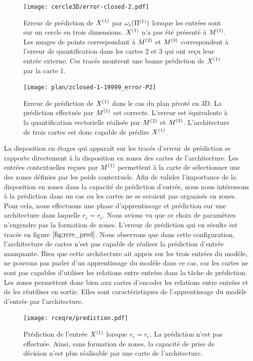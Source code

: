 \documentclass[../main]{subfiles}
\begin{document}
\begin{figure}
	\texttt{[image: cercle3D/error-closed-2.pdf]}
	\caption{Erreur de prédiction de $X^{({1})}$ par $\omega_e(\Pi^{({1})})$ lorsque les entrées sont sur un cercle en trois dimensions. $X^{({1})}$ n'a pas été présenté à $M^{({1})}$.
	 Les nuages de points correspondant à $M^{({2})}$ et $M^{({3})}$ correspondent à l'erreur de quantification dans les cartes 2 et 3 qui ont reçu leur entrée externe. Ces tracés montrent une bonne prédiction de $X^{({1})}$ par la carte 1. \label{fig:pred_cercle}}
\end{figure}

\begin{figure}
	\texttt{[image: plan/zclosed-1-19999\_error-P2]}	
	\caption{Erreur de prédiction de $X^{({1})}$ dans le cas du plan pivoté en 3D. La prédiction effectuée par $M^{({1})}$ est correcte. L'erreur est équivalente à la quantification vectorielle réalisée par $M^{({2})}$ et $M^{({3})}$. L'architecture de trois cartes est donc capable de prédire $X^{({1})}$. \label{fig:plan3_pred}}
\end{figure}

La disposition en étages qui apparaît sur les tracés d'erreur de prédiction se rapporte directement à la disposition en zones des cartes de l'architecture. Les entrées contextuelles reçues par $M^{({1})}$ permettent à la carte de sélectionner une des zones définies par les poids contextuels.
Afin de valider l'importance de la disposition en zones dans la capacité de prédiction d'entrée, nous nous intéressons à la prédiction dans un cas ou les cartes ne se seraient pas organisés en zones.
Pour cela, nous effectuons une phase d'apprentissage et prédiction sur une architecture dans laquelle $r_c = r_e$. 
Nous avions vu que ce choix de paramètres n'engendre pas la formation de zones. L'erreur de prédiction qui en résulte est tracée en figure $\ref{fig:rcre_pred}$.
Nous observons que dans cette configuration, l'architecture de cartes n'est pas capable de réaliser la prédiction d'entrée manquante.
Bien que cette architecture ait appris sur les trois entrées du modèle, ne pouvons pas parler d'un apprentissage du modèle dans ce cas, car les cartes ne sont pas capables d'utiliser les relations entre entrées dans la tâche de prédiction.
Les zones permettent donc bien aux cartes d'encoder les relations entre entrées et de les réutiliser en sortie. Elles sont caractéristiques de l'apprentissage du modèle d'entrée par l'architecture.

\begin{figure}
	\centering\texttt{[image: rceqre/prediction.pdf]}
	\caption{Prédiction de l'entrée $X^{({1})}$ lorsque $r_c = r_e$. La prédiction n'est pas effectuée. Ainsi, sans formation de zones, la capacité de prise de décision n'est plus réalisable par une carte de l'architecture. \label{fig:rcre_pred}}
\end{figure}
\end{document}
